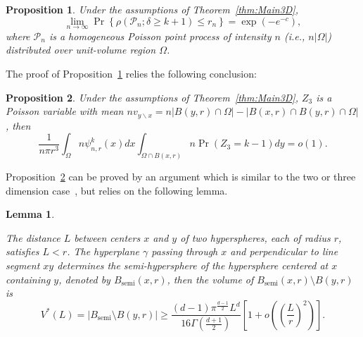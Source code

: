 \documentclass[preprint,12pt]{elsarticle}
\newtheorem{proposition}{Proposition}
\newtheorem{lemma}{Lemma}
\begin{document}
\begin{proposition}\label{pro:Poisson-Version}
Under the assumptions of Theorem~\ref{thm:Main3D},
\begin{equation}\label{eq:concusion-1-Poisson}
\lim_{n\rightarrow\infty}\Pr\left\{\rho(\mathcal{P}_n;\delta\geq k+1)\leq r_n\right\} =\exp\left(-e^{-c}\right),
\end{equation}
where $\mathcal{P}_n$ is a homogeneous Poisson point process of intensity $n$ (i.e., $n|\Omega|$) distributed over unit-volume  region $\Omega$.
\end{proposition}



The proof of Proposition~\ref{pro:Poisson-Version} relies the following  conclusion:
\begin{proposition}\label{proposition1} Under the assumptions of Theorem~\ref{thm:Main3D}, $Z_3$ is a Poisson variable with mean $nv_{y\backslash x}=n|B(y,r)\cap \Omega|-|B(x,r)\cap B(y,r)\cap \Omega|$, then
  \begin{equation*}
\frac{1}{n\pi r^3}\int_{\Omega}n\psi^k_{n,r}(x)dx\int_{\Omega\cap
B(x,r)}n\Pr(Z_3=k-1)dy=o(1).
\end{equation*}
\end{proposition}

Proposition~\ref{proposition1} can be proved by an argument which is similar to the two or three dimension case~\cite{Ding-RGG2018, Ding-RGG2025, Ding2022-3DRadii}, but relies on the following lemma.

\begin{lemma}\label{lem:shadow-low-bound}

The distance $L $ between centers $x$ and $y$ of two hyperspheres, each of radius $r$, satisfies $L < r$. The hyperplane $\gamma$ passing through $x$ and perpendicular to line segment $xy$ determines the semi-hypersphere of the hypersphere centered at $x$ containing $y$, denoted by $B_{\mathrm{semi}}(x,r)$, then the volume of $B_{\mathrm{semi}}(x,r)\setminus B(y,r)$ is
$$V^{*}(L)=|B_{\mathrm{semi}}\setminus B(y,r)|\geq \frac{(d-1)\pi^{\frac{d-1}{2}} L^d}{16\Gamma\left(\frac{d+1}{2}\right)}\left[ 1+ o\left(\left(\frac{L}{r}\right)^2\right) \right].$$
\end{lemma}
\end{document}
